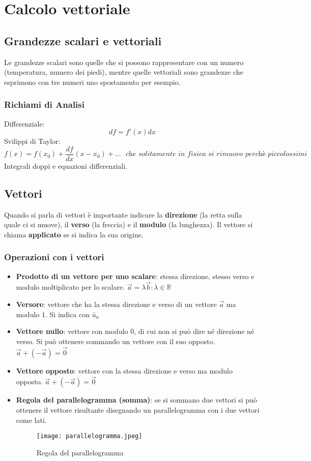 \documentclass[../../main.tex]{subfiles}
\begin{document}
\section{Calcolo vettoriale}
\subsection{Grandezze scalari e vettoriali}
Le grandezze scalari sono quelle che si possono rappresentare con un numero (temperatura, numero dei piedi), mentre quelle vettoriali sono grandezze che esprimono con tre numeri uno spostamento per esempio.
\subsubsection{Richiami di Analisi}
Differenziale:
\[
    df = f'(x)dx
\]
Svilippi di Taylor:
\[
    f(x) = f(x_0) + \dfrac{df}{dx} (x-x_0) + \ldots \ \ \ \textit{che solitamente in fisica si rimuovo perchè piccolossimi}
\]
Integrali doppi e equazioni differenziali.
\subsection{Vettori}
Quando si parla di vettori è importante indicare la \textbf{direzione} (la retta sulla quale ci si muove), il \textbf{verso} (la freccia) e il \textbf{modulo} (la lunghezza). Il vettore si chiama \textbf{applicato} se si indica la sua origine.
\subsubsection{Operazioni con i vettori}
\begin{itemize}
    \item \textbf{Prodotto di un vettore per uno scalare}: stessa direzione, stesso verso e modulo moltiplicato per lo scalare. $\vec{a} = \lambda \vec{b} : \lambda \in \mathbb{R}$
    \item \textbf{Versore}: vettore che ha la stessa direzione e verso di un vettore $\vec{a}$ ma modulo $1$. Si indica con $\bar{u}_a$
    \item \textbf{Vettore nullo}: vettore con modulo $0$, di cui non si può dire né direzione né verso. Si può ottenere sommando un vettore con il suo opposto. $\vec{a} + (-\vec{a}) = \vec{0}$
    \item \textbf{Vettore opposto}: vettore con la stessa direzione e verso ma modulo opposto. $\vec{a} + (-\vec{a}) = \vec{0}$
    \item \textbf{Regola del parallelogramma (somma)}: se si sommano due vettori si può ottenere il vettore risultante disegnando un parallelogramma con i due vettori come lati.
    \begin{figure}[h!]
        \centering
        \texttt{[image: parallelogramma.jpeg]}
        \caption{Regola del parallelogramma}
    \end{figure}
\end{itemize}
\end{document}
